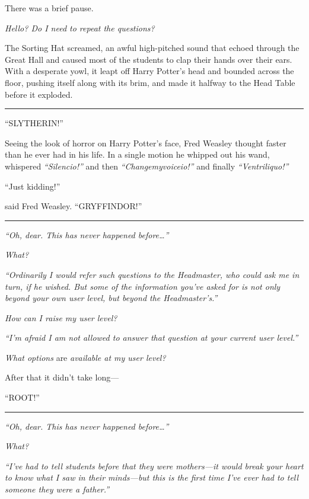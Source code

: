 There was a brief pause.

\emph{Hello? Do I need to repeat the questions?}

The Sorting Hat screamed, an awful high-pitched sound that echoed
through the Great Hall and caused most of the students to clap their
hands over their ears. With a desperate yowl, it leapt off Harry
Potter's head and bounded across the floor, pushing itself along with
its brim, and made it halfway to the Head Table before it exploded.

\begin{center}\rule{3in}{0.4pt}\end{center}

``SLYTHERIN!''

Seeing the look of horror on Harry Potter's face, Fred Weasley thought
faster than he ever had in his life. In a single motion he whipped out
his wand, whispered \emph{``Silencio!''} and then
\emph{``Changemyvoiceio!''} and finally \emph{``Ventriliquo!''}

``Just kidding!''

said Fred Weasley. ``GRYFFINDOR!''

\begin{center}\rule{3in}{0.4pt}\end{center}

\emph{``Oh, dear. This has never happened before\ldots{}''}

\emph{What?}

\emph{``Ordinarily I would refer such questions to the Headmaster, who
could ask me in turn, if he wished. But some of the information you've
asked for is not only beyond your own user level, but beyond the
Headmaster's.''}

\emph{How can I raise my user level?}

\emph{``I'm afraid I am not allowed to answer that question at your
current user level.''}

\emph{What options} are \emph{available at my user level?}

After that it didn't take long---

``ROOT!''

\begin{center}\rule{3in}{0.4pt}\end{center}

\emph{``Oh, dear. This has never happened before\ldots{}''}

\emph{What?}

\emph{``I've had to tell students before that they were mothers---it
would break your heart to know what I saw in their minds---but this is
the first time I've ever had to tell someone they were a father.''}

